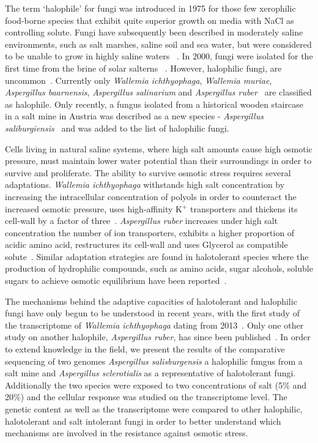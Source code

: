 \documentclass[jof,article,submit,moreauthors,pdftex,10pt,a4paper]{Definitions/mdpi}
\newcommand{\aspRub}{\textit{Aspergillus ruber}}
\newcommand{\walIch}{\textit{Wallemia ichthyophaga}}
\newcommand{\phiSp}{\textit{Aspergillus salisburgensis}}
\newcommand{\phiScl}{\textit{Aspergillus sclerotialis}}
\begin{document}
The term `halophile' for fungi was introduced in 1975 for those few xerophilic food-borne species that exhibit quite superior growth on media with NaCl as controlling solute. Fungi have subsequently been described in moderately saline environments, such as salt marshes, saline soil and sea water, but were considered to be unable to grow in highly saline waters ~\cite{Gunde-Cimerman2000}. In 2000, fungi were isolated for the first time from the brine of solar salterns ~\cite{Gunde-Cimerman2000, Oren2002}. However, halophilic fungi, are uncommon~\cite{Gunde-Cimerman2000}. Currently only \walIch{}, \textit{Wallemia muriae}, \textit{Aspergillus baarnensis}, \textit{Aspergillus salinarium} and \aspRub{}~\cite{Kis-Papo2014-dn} are classified as halophile. Only recently, a fungus isolated from a historical wooden staircase in a salt mine in Austria was described as a new species - \textit{Aspergillus saliburgiensis}~\cite{Martinelli2017AspergillusMorphology,Pinar2016} and was added to the list of halophilic fungi. 

Cells living in natural saline systems, where high salt amounts cause high osmotic pressure, must maintain lower water potential than their surroundings in order to survive and proliferate. The ability to survive osmotic stress requires several adaptations. \walIch{} withstands high salt concentration by increasing the intracellular concentration of polyols in order to counteract the increased osmotic pressure, uses high-affinity K$^+$ transporters and thickens its cell-wall by a factor of three~\cite{Zajc2013}. \aspRub{} increases under high salt concentration  the number of ion transporters, exhibits a higher proportion of acidic amino acid, restructures its cell-wall and uses Glycerol as compatible solute~\cite{Kis-Papo2014-dn}. Similar adaptation strategies are found in halotolerant species where the production of hydrophilic compounds, such as amino acids, sugar alcohols, soluble sugars to achieve osmotic equilibrium have been reported~\cite{Attaby2001,Plemenitas2014,Krauke2010-ed,Michan2013,Salmeron2011}.

The mechanisms behind the adaptive capacities of halotolerant and halophilic fungi have only begun to be understood in recent years, with the first study of the transcriptome of \walIch{} dating from 2013~\cite{Zajc2013}. Only one other study on another halophile, \aspRub{}, has since been published~\cite{Kis-Papo2014-dn}. In order to extend knowledge in the field, we present the results of the comparative sequencing of two genomes \phiSp{} a halophilic fungus from a salt mine and \phiScl{} as a representative of halotolerant fungi. Additionally the two species were exposed to two concentrations of salt (5$\%$ and 20$\%$) and the cellular response was studied on the transcriptome level.  The genetic content as well as the transcriptome were compared to other halophilic, halotolerant and salt intolerant fungi in order to better understand which mechanisms are involved in the resistance against osmotic stress.
\end{document}
